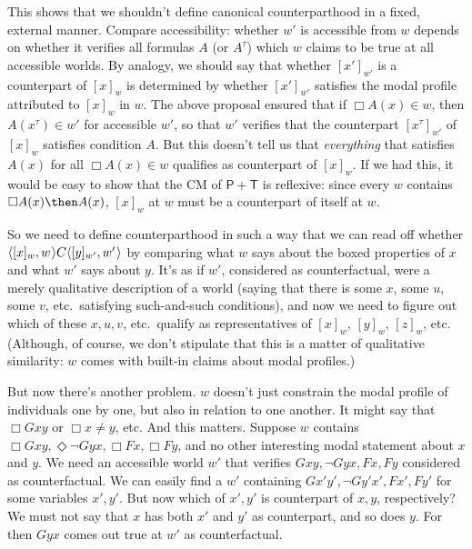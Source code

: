 \documentclass[11pt]{woarticle}
\theoremstyle{break}
\theoremstyle{nonumberplain}
\newcommand{\s}[1]{\ensuremath{\mathsf{#1}}}
\newcommand{\1}{\;\,|\;\,}
\renewcommand{\t}[1]{\ensuremath{\langle #1  \makebox[.2ex]{}\rangle}}
\begin{document}
{  This shows that we shouldn't define canonical counterparthood in a fixed,
  external manner. Compare accessibility: whether $w'$ is accessible from $w$
  depends on whether it verifies all formulas $A$ (or $A^\tau$) which $w$ claims
  to be true at all accessible worlds. By analogy, we should say that whether
  $[x']_{w'}$ is a counterpart of $[x]_{w}$ is determined by whether $[x']_{w'}$
  satisfies the modal profile attributed to $[x]_w$ in $w$. The above proposal
  ensured that if $\Box A(x) \in w$, then $A(x^\tau) \in w'$ for accessible
  $w'$, so that $w'$ verifies that the counterpart $[x^\tau]_{w'}$ of $[x]_w$
  satisfies condition $A$. But this doesn't tell us that \emph{everything} that
  satisfies $A(x)$ for all $\Box A(x) \in w$ qualifies as counterpart of
  $[x]_w$. If we had this, it would be easy to show that the CM of \s{P+T} is
  reflexive: since every $w$ contains $\Box A(x) \then A(x)$, $[x]_w$ at $w$
  must be a counterpart of itself at $w$.

  So we need to define counterparthood in such a way that we can read off
  whether $\t{[x]_w,w}C\t{[y]_{w'},w'}$ by comparing what $w$ says about the
  boxed properties of $x$ and what $w'$ says about $y$. It's as if $w'$,
  considered as counterfactual, were a merely qualitative description of a world
  (saying that there is some $x$, some $u$, some $v$, etc.\ satisfying
  such-and-such conditions), and now we need to figure out which of these
  $x,u,v$, etc.\ qualify as representatives of $[x]_w$, $[y]_w$, $[z]_w$, etc.
  (Although, of course, we don't stipulate that this is a matter of qualitative
  similarity: $w$ comes with built-in claims about modal profiles.)

  But now there's another problem. $w$ doesn't just constrain the modal profile
  of individuals one by one, but also in relation to one another. It might say
  that $\Box Gxy$ or $\Box x\!\not=\!y$, etc. And this matters. Suppose $w$
  contains $\Box Gxy, \Diamond \neg Gyx, \Box Fx, \Box Fy$, and no other
  interesting modal statement about $x$ and $y$. We need an accessible world
  $w'$ that verifies $Gxy, \neg Gyx, Fx, Fy$ considered as counterfactual. We
  can easily find a $w'$ containing $Gx'y', \neg Gy'x', Fx', Fy'$ for some
  variables $x',y'$. But now which of $x',y'$ is counterpart of $x,y$,
  respectively? We must not say that $x$ has both $x'$ and $y'$ as counterpart,
  and so does $y$. For then $Gyx$ comes out true at $w'$ as counterfactual.

}
\end{document}
